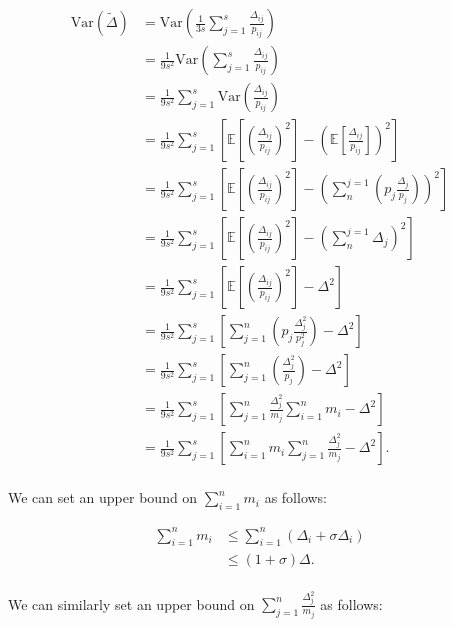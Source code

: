 \documentclass[11pt, margin=1in]{article}
\begin{document}
\[
\begin{aligned}
\mathrm{Var}\left(\tilde{\Delta}\right) &= \mathrm{Var} \left( \frac{1}{3s} \sum_{j = 1}^{s} \frac{\Delta_{ij}}{p_{ij}} \right) \\
&= \frac{1}{9s^2} \mathrm{Var} \left( \sum_{j = 1}^{s} \frac{\Delta_{ij}}{p_{ij}} \right) \\
&= \frac{1}{9s^2} \sum_{j = 1}^{s} \mathrm{Var} \left( \frac{\Delta_{ij}}{p_{ij}} \right) \\
&= \frac{1}{9s^2} \sum_{j = 1}^{s} \left[\mathbb{E}\left[\left(\frac{\Delta_{ij}}{p_{ij}}\right)^2\right] - \left(\mathbb{E}\left[\frac{\Delta_{ij}}{p_{ij}}\right]\right)^2\right] \\
&= \frac{1}{9s^2} \sum_{j = 1}^{s} \left[\mathbb{E}\left[\left(\frac{\Delta_{ij}}{p_{ij}}\right)^2\right] - \left(\sum_{n}^{j=1}\left(p_j \frac{\Delta_j}{p_j}\right)\right)^2\right] \\
&= \frac{1}{9s^2} \sum_{j = 1}^{s} \left[\mathbb{E}\left[\left(\frac{\Delta_{ij}}{p_{ij}}\right)^2\right] - \left(\sum_{n}^{j=1}\Delta_j\right)^2\right] \\
&= \frac{1}{9s^2} \sum_{j = 1}^{s} \left[\mathbb{E}\left[\left(\frac{\Delta_{ij}}{p_{ij}}\right)^2\right] - \Delta^2\right] \\
&= \frac{1}{9s^2} \sum_{j = 1}^{s} \left[\sum_{j = 1}^{n}\left(p_j \frac{\Delta_j^2}{p_j^2}\right) - \Delta^2\right] \\
&= \frac{1}{9s^2} \sum_{j = 1}^{s} \left[\sum_{j = 1}^{n}\left(\frac{\Delta_j^2}{p_j}\right) - \Delta^2\right] \\
&= \frac{1}{9s^2} \sum_{j = 1}^{s} \left[\sum_{j = 1}^{n}\frac{\Delta_j^2}{m_j} \sum_{i = 1}^{n}m_i - \Delta^2\right] \\
&= \frac{1}{9s^2} \sum_{j = 1}^{s} \left[\sum_{i = 1}^{n}m_i \sum_{j = 1}^{n}\frac{\Delta_j^2}{m_j} - \Delta^2\right]. \\
\end{aligned}
\]

We can set an upper bound on $\sum_{i = 1}^{n}m_i$ as follows:

\[
\begin{aligned}
\sum_{i = 1}^{n}m_i &\leq \sum_{i = 1}^{n}\left(\Delta_i + \sigma \Delta_i\right) \\
&\leq \left(1 + \sigma\right) \Delta. \\
\end{aligned}
\]

We can similarly set an upper bound on $\sum_{j = 1}^{n}\frac{\Delta_j^2}{m_j}$ as follows:
\end{document}
